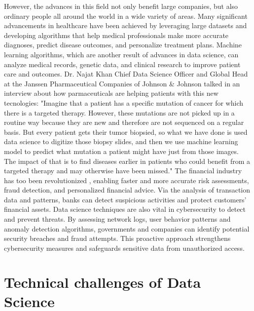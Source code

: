 \documentclass{vgtc}                          %
\begin{document}
However, the advances in this field not only benefit large companies, but also ordinary people all around the world in a wide variety of areas. Many significant advancements in 
healthcare have been achieved by leveraging large datasets and developing algorithms that help medical professionals make more accurate diagnoses, predict disease outcomes, and 
personalize treatment plans. Machine learning algorithms, which are another result of advances in data science, can analyze medical records, genetic data, and clinical research 
to improve patient care and outcomes. Dr. Najat Khan Chief Data Science Officer and Global Head at the Janssen Pharmaceutical Companies of Johnson \& Johnson talked in an interview 
about how parmaceuticals are helping patients with this new tecnologies: "Imagine that a patient has a specific mutation of cancer for which there is a targeted therapy. However, 
these mutations are not picked up in a routine way because they are new and therefore are not sequenced on a regular basis. But every patient gets their tumor biopsied, so what we have 
done is used data science to digitize those biopsy slides, and then we use machine learning model to predict what mutation a patient might have just from those images. The impact of 
that is to find diseases earlier in patients who could benefit from a targeted therapy and may otherwise have been missed."\cite{Robinson:2022} The financial industry has too  been 
revolutionized , enabling faster and more accurate risk assessments, fraud detection, and personalized financial advice. Via the analysis of transaction data and patterns, banks can 
detect suspicious activities and protect customers' financial assets. Data science techniques are also vital in cybersecurity to detect and prevent threats. By assessing network logs, 
user behavior patterns and anomaly detection algorithms, governments and companies can identify potential security breaches and fraud attempts. This proactive approach strengthens 
cybersecurity measures and safeguards sensitive data from unauthorized access.

\section{Technical challenges of Data Science}
\end{document}
